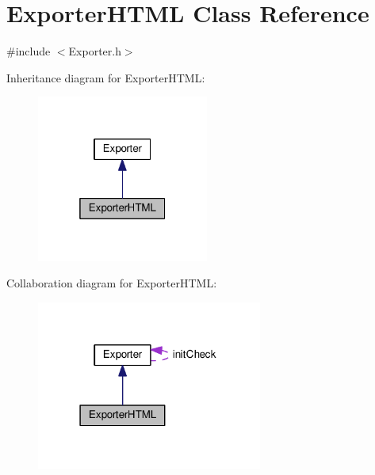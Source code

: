 \hypertarget{class_exporter_h_t_m_l}{}\section{Exporter\+H\+T\+ML Class Reference}
\label{class_exporter_h_t_m_l}


{\ttfamily \#include $<$Exporter.\+h$>$}



Inheritance diagram for Exporter\+H\+T\+ML\+:
\nopagebreak
\begin{figure}[H]
\begin{center}
\leavevmode
\includegraphics[width=160pt]{class_exporter_h_t_m_l__inherit__graph}
\end{center}
\end{figure}


Collaboration diagram for Exporter\+H\+T\+ML\+:
\nopagebreak
\begin{figure}[H]
\begin{center}
\leavevmode
\includegraphics[width=210pt]{class_exporter_h_t_m_l__coll__graph}
\end{center}
\end{figure}

